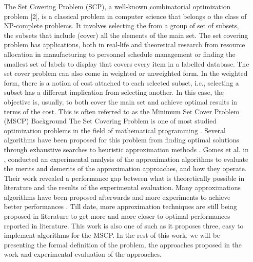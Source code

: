 The Set Covering Problem (SCP), a well-known combinatorial optimization problem [2], is a classical problem in computer science that belongs o the class of NP-complete problems. It involves selecting the from a group of set of subsets, the subsets that include (cover) all the elements of the main set. The set covering problem has applications, both in real-life and theoretical research from resource allocation in manufacturing to personnel schedule management or finding the smallest set of labels to display that covers every item in a labelled database.   The set cover problem can also come in weighted or unweighted form.  In the weighted form, there is a notion of cost attached to each selected subset, i.e., selecting a subset has a different implication from selecting another. In this case, the objective is, usually, to both cover the main set and achieve optimal results in terms of the cost. This is often referred to as the Minimum Set Cover Problem (MSCP)
Background
The Set Covering Problem is one of most studied optimization problems in the field of mathematical programming \cite{yelbay2012set}. Several algorithms have been proposed for this problem from finding optimal solutions through exhaustive searches to heuristic approximation methods \cite{gomes2006experimental}. Gomes et al. in \cite{gomes2006experimental} , conducted an experimental analysis of the approximation algorithms to evaluate the merits and demerits of the approximation approaches, and how they operate. Their work revealed a performance gap between what is theoretically possible in literature and the results of the experimental evaluation. Many approximations algorithms have been proposed afterwards and more experiments to achieve better performances \cite{akhter2015heuristic}. Till date, more approximation techniques are still being proposed in literature to get more and more closer to optimal performances reported in literature. This work is also one of such as it proposes three, easy to implement algorithms for the MSCP. In the rest of this work, we will be presenting the formal definition of the problem, the approaches proposed in the work and experimental evaluation of the approaches. 
